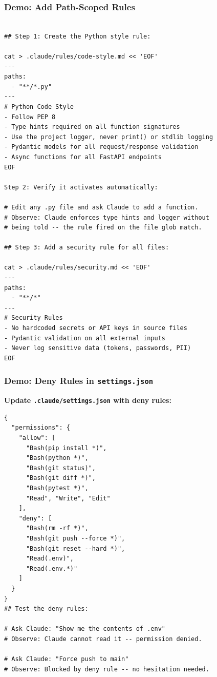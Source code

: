 \begin{frame}[fragile]\frametitle{Demo: Add Path-Scoped Rules}

\begin{lstlisting}

## Step 1: Create the Python style rule:

cat > .claude/rules/code-style.md << 'EOF'
---
paths:
  - "**/*.py"
---
# Python Code Style
- Follow PEP 8
- Type hints required on all function signatures
- Use the project logger, never print() or stdlib logging
- Pydantic models for all request/response validation
- Async functions for all FastAPI endpoints
EOF

Step 2: Verify it activates automatically:

# Edit any .py file and ask Claude to add a function.
# Observe: Claude enforces type hints and logger without
# being told -- the rule fired on the file glob match.

## Step 3: Add a security rule for all files:

cat > .claude/rules/security.md << 'EOF'
---
paths:
  - "**/*"
---
# Security Rules
- No hardcoded secrets or API keys in source files
- Pydantic validation on all external inputs
- Never log sensitive data (tokens, passwords, PII)
EOF
\end{lstlisting}
\end{frame}

\begin{frame}[fragile]\frametitle{Demo: Deny Rules in \texttt{settings.json}}

\textbf{Update \texttt{.claude/settings.json} with deny rules:}
\begin{lstlisting}
{
  "permissions": {
    "allow": [
      "Bash(pip install *)",
      "Bash(python *)",
      "Bash(git status)",
      "Bash(git diff *)",
      "Bash(pytest *)",
      "Read", "Write", "Edit"
    ],
    "deny": [
      "Bash(rm -rf *)",
      "Bash(git push --force *)",
      "Bash(git reset --hard *)",
      "Read(.env)",
      "Read(.env.*)"
    ]
  }
}
## Test the deny rules:

# Ask Claude: "Show me the contents of .env"
# Observe: Claude cannot read it -- permission denied.

# Ask Claude: "Force push to main"
# Observe: Blocked by deny rule -- no hesitation needed.
\end{lstlisting}
\end{frame}

